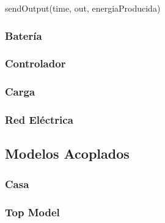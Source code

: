 \begin{algorithm}
    \caption{$\lambda (s)$}
    \begin{algorithmic}
    \STATE sendOutput(time, out, energiaProducida)
    \end{algorithmic}
\end{algorithm}

\subsubsection{Batería}
\subsubsection{Controlador}
\subsubsection{Carga}
\subsubsection{Red Eléctrica}

\subsection{Modelos Acoplados}

\subsubsection{Casa}
\subsubsection{Top Model}